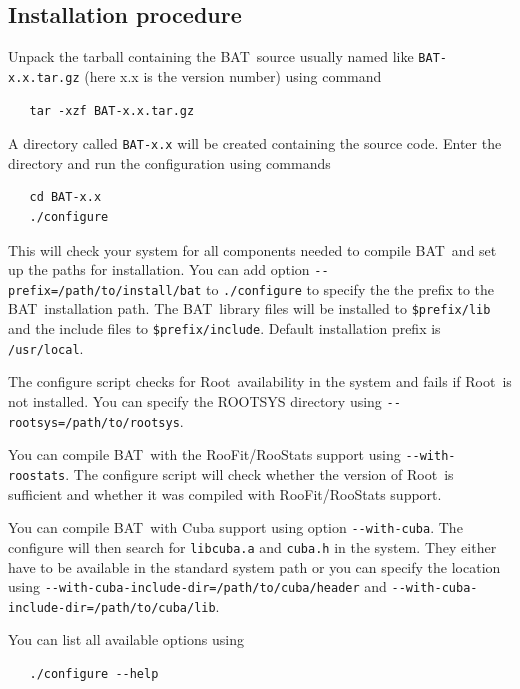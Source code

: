 \documentclass[11pt, a4paper]{article}
\newcommand{\bat}{{\sc BAT}}
\newcommand{\BAT}{\bat}
\newcommand{\Root}{{\sc Root}}
\begin{document}

\subsection{Installation procedure}

Unpack the tarball containing the \bat\ source usually named like
\verb|BAT-x.x.tar.gz| (here x.x is the version number) using command
%
\begin{verbatim}
   tar -xzf BAT-x.x.tar.gz
\end{verbatim}
%
A directory called \verb|BAT-x.x| will be created containing the source code.
Enter the directory and run the configuration using commands
%
\begin{verbatim}
   cd BAT-x.x
   ./configure
\end{verbatim}

This will check your system for all components needed to compile \bat\
and set up the paths for installation. You can add option
\verb|--prefix=/path/to/install/bat| to \verb|./configure| to specify
the the prefix to the \bat\ installation path. The \bat\ library files
will be installed to \verb|$prefix/lib| and the include files to
\verb|$prefix/include|. Default installation prefix is
\verb|/usr/local|.

The configure script checks for \Root\ availability in the system and
fails if \Root\ is not installed. You can specify the ROOTSYS directory
using \verb|--rootsys=/path/to/rootsys|.

You can compile \BAT\ with the RooFit/RooStats support using
\verb|--with-roostats|. The configure script will check whether the version of
\Root\ is sufficient and whether it was compiled with RooFit/RooStats
support.

You can compile \BAT\ with Cuba support using option \verb|--with-cuba|.
The configure will then search for \verb|libcuba.a| and \verb|cuba.h| in
the system. They either have to be available in the standard system path
or you can specify the location using
\verb|--with-cuba-include-dir=/path/to/cuba/header|
and \verb|--with-cuba-include-dir=/path/to/cuba/lib|.

You can list all available options using
%
\begin{verbatim}
   ./configure --help
\end{verbatim}
\end{document}
